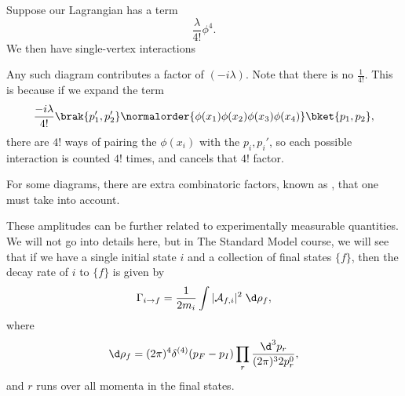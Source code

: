 \documentclass[a4paper]{article}
\begin{document}
\begin{eg}
  Suppose our Lagrangian has a term
  \[
    \frac{\lambda}{4!} \phi^4.
  \]
  We then have single-vertex interactions
  \begin{center}
  \end{center}
  Any such diagram contributes a factor of $(-i\lambda)$. Note that there is no $\frac{1}{4!}$. This is because if we expand the term
  \[
    \frac{-i \lambda}{4!} \brak{p_1', p_2'} \normalorder{\phi(x_1)\phi(x_2)\phi(x_3)\phi(x_4)}\bket{p_1, p_2},
  \]
  there are $4!$ ways of pairing the $\phi(x_i)$ with the $p_i, p_i'$, so each possible interaction is counted $4!$ times, and cancels that $4!$ factor.

  For some diagrams, there are extra combinatoric factors, known as , that one must take into account.
\end{eg}

These amplitudes can be further related to experimentally measurable quantities. We will not go into details here, but in The Standard Model course, we will see that if we have a single initial state $i$ and a collection of final states $\{f\}$, then the decay rate of $i$ to $\{f\}$ is given by
\[
  \Gamma_{i \to f} = \frac{1}{2 m_i} \int |\mathcal{A}_{f,i}|^2 \;\d \rho_f,
\]
where
\[
  \d \rho_f = (2\pi)^4 \delta^{(4)}(p_F - p_I) \prod_r \frac{\d^3 p_r}{(2\pi)^3 2 p_r^0},
\]
and $r$ runs over all momenta in the final states.
\end{document}
